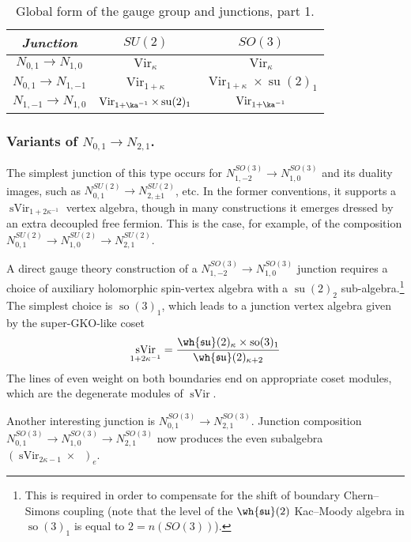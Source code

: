 \documentclass[11pt,reqno]{amsart}
\theoremstyle{plain}
\numberwithin{equation}{section}
\newcommand{\R}{\mathbb{R}}
\DeclareMathOperator{\Vir}{Vir}
\DeclareMathOperator{\sVir}{sVir}
\DeclareMathOperator{\tsu}{su}
\DeclareMathOperator{\tso}{so}
\DeclareMathOperator{\Ff}{\bigwedge_{\R}}
\theoremstyle{definition}
\begin{document}
\begin{table}[h]
\begin{center}
\begin{tabular}{|c||c||c|}
\hline
{\em Junction} & {\em $SU(2)$}& {\em $SO(3)$}  \\
\hline \hline
$N_{0,1} \to N_{1,0}$& $\Vir_\kappa$& $\Vir_\kappa$  \\ 
\hline
$N_{0,1} \to N_{1,-1}$ & $\Vir_{1+\kappa}$& $\Vir_{1+\kappa}\times \tsu(2)_1$  \\
\hline
$N_{1,-1} \to N_{1,0}$& $\Vir_{1+\ka^{-1}}\times \tsu(2)_1$& $\Vir_{1+\ka^{-1}}$ \\
\hline
\end{tabular} 
\end{center}
\vspace*{5mm}
\caption{Global form of the gauge group and junctions, part 1.}\label{tab:four}
\end{table}


\subsubsection{Variants of $N_{0,1}\to N_{2,1}$. }
The simplest junction of this type occurs for $N^{SO(3)}_{1,-2}\to N^{SO(3)}_{1,0}$ 
and its duality images, such as $N^{SU(2)}_{0,1}\to N^{SU(2)}_{2,\pm 1}$, etc. In the former conventions, it supports a $\sVir_{1+2 \kappa^{-1}}$ vertex algebra, though in many constructions 
it emerges dressed by an extra decoupled free fermion. This is the case, 
for example, of the composition $N^{SU(2)}_{0,1}\to N^{SU(2)}_{1,0}\to N^{SU(2)}_{2,1}$.

A direct gauge theory construction of a $N^{SO(3)}_{1,-2}\to N^{SO(3)}_{1,0}$
junction requires a choice of auxiliary holomorphic spin-vertex algebra 
with a $\tsu(2)_2$ sub-algebra.\footnote{This is required in
order to compensate for the shift of boundary Chern--Simons coupling
(note that the level of the $\wh{\mathfrak{su}}(2)$ Kac--Moody algebra
in $\tso(3)_1$ is equal to $2 = n(SO(3))$).} 
The simplest choice is $\tso(3)_1$, which leads to 
a junction vertex algebra given by the 
super-GKO-like coset
$$
\sVir_{1+2 \kappa^{-1}} =
\frac{\wh{\mathfrak{su}}(2)_{\kappa} \times
  \tso(3)_1}{\wh{\mathfrak{su}}(2)_{\kappa+2}}
$$
The lines of even weight on both boundaries end on
appropriate coset modules, which are the degenerate modules of 
$\sVir$.

Another interesting junction is $N^{SO(3)}_{0,1}\to N^{SO(3)}_{2,1}$.
Junction composition $N^{SO(3)}_{0,1}\to N^{SO(3)}_{1,0} \to N^{SO(3)}_{2,1}$
now produces the even subalgebra $(\sVir_{2\kappa-1} \times \Ff)_e$. 
\end{document}

